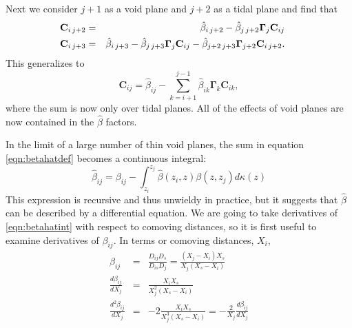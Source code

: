 \documentclass{emulateapj}
\newcommand\C[0]{\mathbf{C}}
\newcommand\GammaMat[0]{\boldsymbol{\Gamma}}
\newcommand\betahat{\hat{\beta}}
\begin{document}
Next we consider $j +1$ as a void plane and $j + 2$ as a tidal plane and find that
\begin{eqnarray}
\hspace*{-0.45cm}\C_{i \, j+2} &=& \betahat_{i \, j+2} - \betahat_{j \, j + 2} \GammaMat_j \C_{i j}\\
\hspace*{-0.45cm}\C_{i \, j+3} &=& \betahat_{i \, j+3} - \betahat_{j \, j + 3} \GammaMat_j \C_{i j} - \betahat_{j+2 \, j+3} \GammaMat_{j+2} \C_{i \, j+2}.
\end{eqnarray}
This generalizes to 
\begin{equation}
\C_{i j} = \betahat_{i j} - \sum\limits_{k = i +1}^{j - 1} \betahat_{i k} \GammaMat_k \C_{i k},
\end{equation}
where the sum is now only over tidal planes. All of the effects of void planes are now contained in the $\betahat$ factors.
  
In the limit of a large number of thin void planes, the sum in equation \ref{eqn:betahatdef} becomes a continuous integral:
\begin{equation}
\label{eqn:betahatint}
\betahat_{i j} = \beta_{ i j} - \int_{z_i}^{z_j} \betahat(z_i, z) \beta(z, z_j) d\kappa(z)
\end{equation}
This expression is recursive and thus unwieldy in practice, but it suggests that $\betahat$ can be described by a differential equation. We are going to take derivatives of \ref{eqn:betahatint} with respect to comoving distances, so it is first useful to examine derivatives of $\beta_{i j}$. In terms or comoving distances, $X_i$, 
\begin{eqnarray}
\beta_{i j} &=&\frac{D_{i j} D_s}{D_{i s} D_j} = \frac{(X_j - X_i) X_s}{X_j (X_s - X_i)} \\
\frac{d \beta_{i j}}{d X_j} &=& \frac{X_i X_s}{X_j^2 (X_s - X_i)}\\
\label{eqn:d2betahatdbetahat} 
\frac{d^2 \beta_{i j}}{d X_j} &=& -2 \frac{X_i X_s}{X_j^3 (X_s - X_i)} = -\frac{2}{X_j} \frac{d \beta_{i j}}{d X_j} 
\end{eqnarray}
\end{document}
